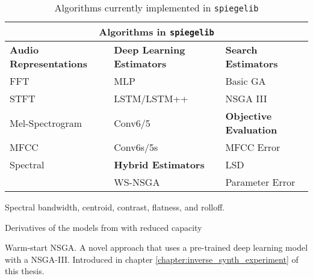 \begin{table*}[t]
\centering\small
\begin{threeparttable}
	\caption{Algorithms currently implemented in \texttt{spiegelib}}
	\label{table:spiegel_algorithms}
	\def\arraystretch{1.125}
	\begin{tabular}{|l|l|l|}
	\hline
	\multicolumn{3}{|c|}{\textbf{Algorithms in \texttt{spiegelib}}} \\
	\hline
	\hline
	\textbf{Audio Representations} & \textbf{Deep Learning Estimators} & \textbf{Search Estimators} \\
	\hline
	FFT 		& MLP \cite{yee2018automatic} 		& Basic GA   			\\
	STFT 		& LSTM/LSTM++ \cite{yee2018automatic} 		& NSGA III \cite{tatar2016automatic}				\\\cline{3-3}
	Mel-Spectrogram		& Conv6/5 \cite{barkan2019inversynth} 	& \textbf{Objective Evaluation} 	\\\cline{3-3}
	MFCC	& Conv6s/5s\tnote{2} 	& MFCC Error \cite{yee2018automatic} 		\\\cline{2-2}
	Spectral\tnote{1} & \textbf{Hybrid Estimators} & LSD \cite{masudo2021quality} \\\cline{2-2}
	& WS-NSGA\tnote{3} & Parameter Error \cite{barkan2019inversynth} \\
	\hline
	\end{tabular}
	\begin{tablenotes}
			\footnotesize
			\item[1] Spectral bandwidth, centroid, contrast, flatness, and rolloff.\\
			\item[2] Derivatives of the models from \cite{barkan2019inversynth} with reduced capacity \\
			\item[3] Warm-start NSGA. A novel approach that uses a pre-trained deep learning model with a NSGA-III. Introduced in chapter \ref{chapter:inverse_synth_experiment} of this thesis.
	\end{tablenotes}
\end{threeparttable}
\end{table*}